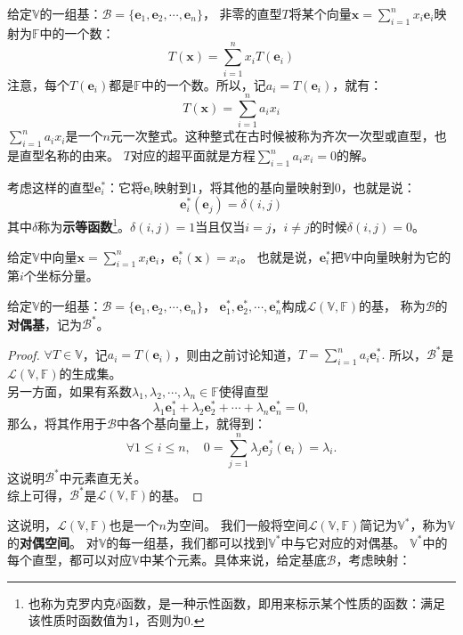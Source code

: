 \documentclass[12pt,UTF8]{ctexbook}
\begin{document}
给定$\mathbb{V}$的一组基：$\mathcal{B} = \{\mathbf{e}_1, \mathbf{e}_2, \cdots, \mathbf{e}_{n}\}$，
非零的直型$T$将某个向量$\mathbf{x} = \sum_{i=1}^n x_i \mathbf{e}_i$映射为$\mathbb{F}$中的一个数：
$$ T(\mathbf{x}) = \sum_{i=1}^n x_i T(\mathbf{e}_i)$$
注意，每个$T(\mathbf{e}_i)$都是$\mathbb{F}$中的一个数。所以，记$a_i = T(\mathbf{e}_i)$，就有：
$$ T(\mathbf{x}) = \sum_{i=1}^n a_i x_i$$
$\sum_{i=1}^n a_i x_i$是一个$n$元一次整式。这种整式在古时候被称为齐次一次型或直型，也是直型名称的由来。
$T$对应的超平面就是方程$ \sum_{i=1}^n a_i x_i = 0$的解。

考虑这样的直型$\mathbf{e}_i^*$：它将$\mathbf{e}_i$映射到$1$，将其他的基向量映射到$0$，也就是说：
$$ \mathbf{e}_i^*(\mathbf{e}_j) = \delta(i,j) $$
其中$\delta$称为\textbf{示等函数}\footnote{也称为克罗内克$\delta$函数，是一种示性函数，即用来标示某个性质的函数：满足该性质时函数值为1，否则为0.}。$\delta(i,j)=1$当且仅当$i=j$，$i\neq j$的时候$\delta(i,j)=0$。

给定$\mathbb{V}$中向量$\mathbf{x} = \sum_{i=1}^n x_i \mathbf{e}_i$，$\mathbf{e}_i^*(\mathbf{x}) = x_i$。
也就是说，$\mathbf{e}_i^*$把$\mathbb{V}$中向量映射为它的第$i$个坐标分量。

\begin{pp}\label{pp:3_5_1}
给定$\mathbb{V}$的一组基：$\mathcal{B} = \{\mathbf{e}_1, \mathbf{e}_2, \cdots, \mathbf{e}_{n}\}$，
$\mathbf{e}_1^*, \mathbf{e}_2^*, \cdots , \mathbf{e}_n^*$构成$\mathcal{L}(\mathbb{V}, \mathbb{F})$的基，
称为$\mathcal{B}$的\textbf{对偶基}，记为$\mathcal{B}^*$。
\end{pp}
\begin{proof} %
$\forall T \in \mathbb{V}$，记$a_i = T(\mathbf{e}_i)$，则由之前讨论知道，$T = \sum_{i=1}^n a_i \mathbf{e}_i^*.$ 
所以，$\mathcal{B}^*$是$\mathcal{L}(\mathbb{V}, \mathbb{F})$的生成集。\\
另一方面，如果有系数$\lambda_1, \lambda_2, \cdots, \lambda_n \in \mathbb{F}$使得直型
$$ \lambda_1 \mathbf{e}_1^* + \lambda_2 \mathbf{e}_2^* + \cdots + \lambda_n \mathbf{e}_n^* = 0,$$
那么，将其作用于$\mathcal{B}$中各个基向量上，就得到：
$$ \forall 1 \leqslant i \leqslant n, \quad 0 = \sum_{j=1}^n \lambda_j \mathbf{e}_j^*(\mathbf{e}_i) = \lambda_i.$$
这说明$\mathcal{B}^*$中元素直无关。\\
综上可得，$\mathcal{B}^*$是$\mathcal{L}(\mathbb{V}, \mathbb{F})$的基。
\end{proof}


这说明，$\mathcal{L}(\mathbb{V}, \mathbb{F})$也是一个$n$为空间。
我们一般将空间$\mathcal{L}(\mathbb{V}, \mathbb{F})$简记为$\mathbb{V}^*$，称为$\mathbb{V}$的\textbf{对偶空间}。
对$\mathbb{V}$的每一组基，我们都可以找到$\mathbb{V}^*$中与它对应的对偶基。
$\mathbb{V}^*$中的每个直型，都可以对应$\mathbb{V}$中某个元素。具体来说，给定基底$\mathcal{B}$，考虑映射：
\end{document}
